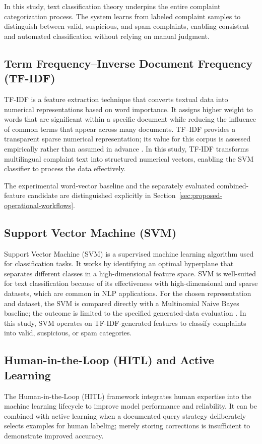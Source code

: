In this study, text classification theory underpins the entire complaint categorization process. The system learns from labeled complaint samples to distinguish between valid, suspicious, and spam complaints, enabling consistent and automated classification without relying on manual judgment.

\subsection{Term Frequency--Inverse Document Frequency (TF-IDF)}
TF-IDF is a feature extraction technique that converts textual data into numerical representations based on word importance. It assigns higher weight to words that are significant within a specific document while reducing the influence of common terms that appear across many documents. TF--IDF provides a transparent sparse numerical representation; its value for this corpus is assessed empirically rather than assumed in advance \cite{sklearntfidf}. In this study, TF-IDF transforms multilingual complaint text into structured numerical vectors, enabling the SVM classifier to process the data effectively.

The experimental word-vector baseline and the separately evaluated combined-feature candidate are distinguished explicitly in Section~\ref{sec:proposed-operational-workflows}.

\subsection{Support Vector Machine (SVM)}
Support Vector Machine (SVM) is a supervised machine learning algorithm used for classification tasks. It works by identifying an optimal hyperplane that separates different classes in a high-dimensional feature space. SVM is well-suited for text classification because of its effectiveness with high-dimensional and sparse datasets, which are common in NLP applications. For the chosen representation and dataset, the SVM is compared directly with a Multinomial Naive Bayes baseline; the outcome is limited to the specified generated-data evaluation \cite{sklearn}. In this study, SVM operates on TF-IDF-generated features to classify complaints into valid, suspicious, or spam categories.

\subsection{Human-in-the-Loop (HITL) and Active Learning}
The Human-in-the-Loop (HITL) framework integrates human expertise into the machine learning lifecycle to improve model performance and reliability. It can be combined with active learning when a documented query strategy deliberately selects examples for human labeling; merely storing corrections is insufficient to demonstrate improved accuracy.

